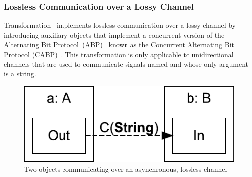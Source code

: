 \subsubsection{Lossless Communication over a Lossy Channel}
\label{subsubsec:slco:ll}

Transformation~ implements lossless communication over a lossy channel by introducing auxiliary objects that implement a concurrent version of the Alternating Bit Protocol~(ABP)~\cite{Bartlett1969} known as the Concurrent Alternating Bit Protocol (CABP)~\cite{Baeten2002}.
This transformation is only applicable to unidirectional channels that are used to communicate signals named  and whose only argument is a string.

\begin{figure}[hbt]
  \centering
  \includegraphics[scale=0.45]{slco/figs/transformations/Communication_Lossless2Lossy}
  \caption{Two objects communicating over an asynchronous, lossless channel}
  \label{fig:slco:ll-comm-before}
\end{figure}

